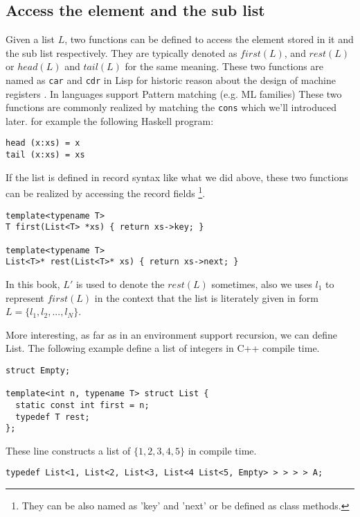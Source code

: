 \documentclass{article}
\begin{document}
\subsection{Access the element and the sub list}
Given a list $L$, two functions can be defined to access the element stored in it and
the sub list respectively. They are typically denoted as $first(L)$, and $rest(L)$ or
$head(L)$ and $tail(L)$ for the same meaning.
These two functions are named as \verb|car| and \verb|cdr| in Lisp for historic reason
about the design of machine registers \cite{SICP}. In languages support Pattern matching (e.g. ML families)
These two functions are commonly realized by matching the \verb|cons| which we'll introduced
later. for example the following Haskell program:

\lstset{language=Haskell}
\begin{lstlisting}
head (x:xs) = x
tail (x:xs) = xs
\end{lstlisting}

If the list is defined in record syntax like what we did above, these two functions can 
be realized by accessing the record fields \footnote{They can be also named as 'key' and 'next'
or be defined as class methods.}.

\lstset{language=C++}
\begin{lstlisting}
template<typename T>
T first(List<T> *xs) { return xs->key; }

template<typename T>
List<T>* rest(List<T>* xs) { return xs->next; }
\end{lstlisting}

In this book, $L'$ is used to denote the $rest(L)$ sometimes, also we uses $l_1$ to represent
$first(L)$ in the context that the list is literately given in form $L = \{ l_1, l_2, ..., l_N\}$.

More interesting, as far as in an environment support recursion, we can define List. The following
example define a list of integers in C++ compile time.

\lstset{language=C++}
\begin{lstlisting}
struct Empty;

template<int n, typename T> struct List {
  static const int first = n;
  typedef T rest;
};
\end{lstlisting}

These line constructs a list of $\{1, 2, 3, 4, 5\}$ in compile time.

\begin{lstlisting}
typedef List<1, List<2, List<3, List<4 List<5, Empty> > > > > A;
\end{lstlisting}
\end{document}
